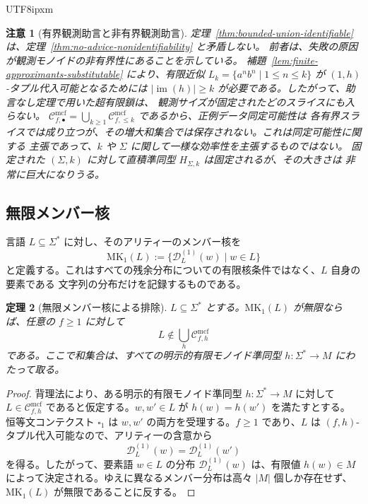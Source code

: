 \documentclass[10pt,a4paper]{article}
\newtheorem{theorem}{定理}[section]
\newtheorem{remark}[theorem]{注意}
\theoremstyle{remark}
\newcommand{\Cmcf}[2]{\mathcal{C}^{\mathrm{mcf}}_{#1,#2}}
\newcommand{\D}{\mathcal{D}}
\newcommand{\blank}{\square}
\begin{document}
\begin{CJK}{UTF8}{ipxm}
\begin{remark}[有界観測助言と非有界観測助言]
\label{rem:bounded-vs-unbounded-union}
定理~\ref{thm:bounded-union-identifiable} は、定理~\ref{thm:no-advice-nonidentifiability} と矛盾しない。
前者は、失敗の原因が観測モノイドの非有界性にあることを示している。
補題~\ref{lem:finite-approximants-substitutable} により、有限近似
\(L_k=\{a^n b^n\mid 1\le n\le k\}\) が \((1,h)\)-タプル代入可能となるためには
\(|\operatorname{im}(h)|\ge k\) が必要である。したがって、助言なし定理で用いた超有限鎖は、
観測サイズが固定されたどのスライスにも入らない。
\(\Cmcf{f}{\bullet}=\bigcup_{k\ge1}\Cmcf{f}{\le k}\) であるから、正例データ同定可能性は
各有界スライスでは成り立つが、その増大和集合では保存されない。これは同定可能性に関する
主張であって、\(k\) や \(\Sigma\) に関して一様な効率性を主張するものではない。
固定された \((\Sigma,k)\) に対して直積準同型 \(H_{\Sigma,k}\) は固定されるが、その大きさは
非常に巨大になりうる。
\end{remark}

\subsection{無限メンバー核}
\label{subsec:member-kernel-exclusion}

言語 \(L\subseteq\Sigma^*\) に対し、そのアリティ一のメンバー核を
\[
  \mathrm{MK}_1(L):=\{\D_L^{(1)}(w)\mid w\in L\}
\]
と定義する。これはすべての残余分布についての有限核条件ではなく、\(L\) 自身の要素である
文字列の分布だけを記録するものである。

\begin{theorem}[無限メンバー核による排除]
\label{thm:member-kernel-exclusion}
\(L\subseteq\Sigma^*\) とする。\(\mathrm{MK}_1(L)\) が無限ならば、任意の \(f\ge1\) に対して
\[
  L\notin \bigcup_h \Cmcf{f}{h}
\]
である。ここで和集合は、すべての明示的有限モノイド準同型
\(h:\Sigma^*\to M\) にわたって取る。
\end{theorem}

\begin{proof}
背理法により、ある明示的有限モノイド準同型 \(h:\Sigma^*\to M\) に対して
\(L\in\Cmcf{f}{h}\) であると仮定する。\(w,w'\in L\) が \(h(w)=h(w')\) を満たすとする。
恒等文コンテクスト \(\blank_1\) は \(w,w'\) の両方を受理する。\(f\ge1\) であり、\(L\) は
\((f,h)\)-タプル代入可能なので、アリティ一の含意から
\[
  \D_L^{(1)}(w)=\D_L^{(1)}(w')
\]
を得る。したがって、要素語 \(w\in L\) の分布 \(\D_L^{(1)}(w)\) は、有限値
\(h(w)\in M\) によって決定される。ゆえに異なるメンバー分布は高々 \(|M|\) 個しか存在せず、
\(\mathrm{MK}_1(L)\) が無限であることに反する。
\end{proof}


\end{CJK}
\end{document}
